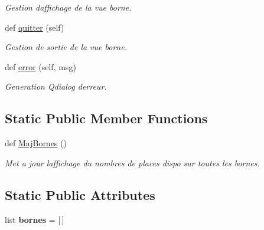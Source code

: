 \begin{DoxyCompactItemize}
\begin{DoxyCompactList}\small\item\em Gestion d\textquotesingle{}affichage de la vue borne. \end{DoxyCompactList}\item 
\hypertarget{classsrc_1_1c_1_1_borne_1_1_borne_a4b8376f2e32a872177874df89b169059}{}def \hyperlink{classsrc_1_1c_1_1_borne_1_1_borne_a4b8376f2e32a872177874df89b169059}{quitter} (self)\label{classsrc_1_1c_1_1_borne_1_1_borne_a4b8376f2e32a872177874df89b169059}

\begin{DoxyCompactList}\small\item\em Gestion de sortie de la vue borne. \end{DoxyCompactList}\item 
def \hyperlink{classsrc_1_1c_1_1_borne_1_1_borne_a91859e52b0416cae88a3722af9fa32a6}{error} (self, msg)
\begin{DoxyCompactList}\small\item\em Generation Qdialog d\textquotesingle{}erreur. \end{DoxyCompactList}\end{DoxyCompactItemize}
\subsection*{Static Public Member Functions}
\begin{DoxyCompactItemize}
\item 
\hypertarget{classsrc_1_1c_1_1_borne_1_1_borne_af8681cee4b130a2756fcbbd11649e2f3}{}def \hyperlink{classsrc_1_1c_1_1_borne_1_1_borne_af8681cee4b130a2756fcbbd11649e2f3}{Maj\+Bornes} ()\label{classsrc_1_1c_1_1_borne_1_1_borne_af8681cee4b130a2756fcbbd11649e2f3}

\begin{DoxyCompactList}\small\item\em Met a jour l\textquotesingle{}affichage du nombres de places dispo sur toutes les bornes. \end{DoxyCompactList}\end{DoxyCompactItemize}
\subsection*{Static Public Attributes}
\begin{DoxyCompactItemize}
\item 
\hypertarget{classsrc_1_1c_1_1_borne_1_1_borne_a3972c8d7fbade2a2fa07e38d063e03ce}{}list {\bfseries bornes} = \mbox{[}$\,$\mbox{]}\label{classsrc_1_1c_1_1_borne_1_1_borne_a3972c8d7fbade2a2fa07e38d063e03ce}

\end{DoxyCompactItemize}



